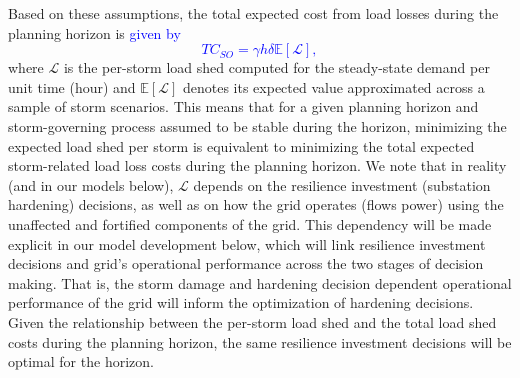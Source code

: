 \documentclass[authoryear,preprint,review,12pt]{elsarticle}\usepackage{amssymb}
\begin{document}
Based on these assumptions, the total expected cost from load losses during the planning horizon is \textcolor{blue}{given by}
\textcolor{blue}{
\begin{equation}
    TC_{SO} = \gamma h \delta \mathbb{E}[\mathcal{L}], \label{tc_so}
\end{equation}
}
\noindent where $\mathcal{L}$ is the per-storm load shed computed for the steady-state demand per unit time (hour) and $\mathbb{E}[\mathcal{L}]$ denotes its expected value approximated across a sample of storm scenarios. This means that for a given planning horizon and storm-governing process assumed to be stable during the horizon, minimizing the expected load shed per storm is equivalent to minimizing the total expected storm-related load loss costs during the planning horizon. We note that in reality (and in our models below), $\mathcal{L}$ depends on the resilience investment (substation hardening) decisions, as well as on how the grid operates (flows power) using the unaffected and fortified components of the grid. This dependency will be made explicit in our model development below, which will link resilience investment decisions and grid's operational performance across the two stages of decision making. That is, the storm damage and hardening decision dependent operational performance of the grid will inform the optimization of hardening decisions. Given the relationship between the per-storm load shed and the total load shed costs during the planning horizon, the same resilience investment decisions will be optimal for the horizon.
\end{document}

